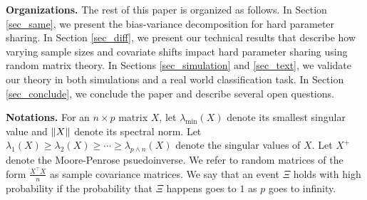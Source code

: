 


\textbf{Organizations.}
The rest of this paper is organized as follows.
In Section \ref{sec_same}, we present the bias-variance decomposition for hard parameter sharing.
In Section \ref{sec_diff}, we present our technical results that describe how varying sample sizes and covariate shifts impact hard parameter sharing using random matrix theory.
In Sections \ref{sec_simulation} and \ref{sec_text}, we validate our theory in both simulations and a real world classification task.
In Section \ref{sec_conclude}, we conclude the paper and describe several open questions.

\textbf{Notations.}
For an $n\times p$ matrix $X$, let $\lambda_{\min}(X)$ denote its smallest singular value and $\|X\|$ denote its spectral norm.
Let $\lambda_1(X) \ge \lambda_2(X) \ge \cdots \ge \lambda_{p\wedge n}(X)$ denote the singular values of $X$.
Let $X^+$ denote the Moore-Penrose psuedoinverse.
We refer to random matrices of the form $\frac {X^\top X} n$ as sample covariance matrices.
We say that an event $\Xi$ holds with high probability if the probability that $\Xi$ happens goes to $1$ as $p$ goes to infinity.

